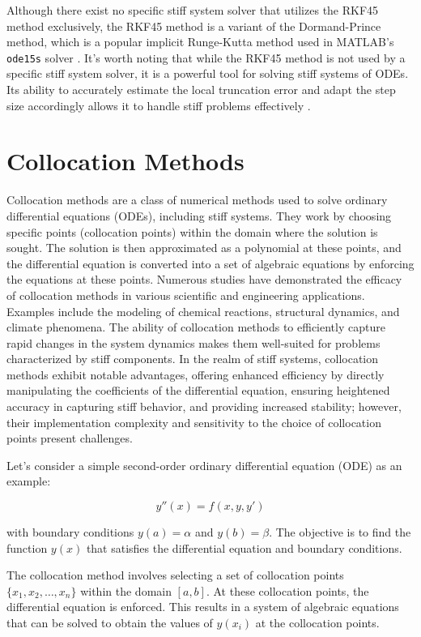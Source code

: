 Although there exist no specific stiff system solver that utilizes the RKF45 method exclusively, the RKF45 method is a variant of the Dormand-Prince method, which is a popular implicit Runge-Kutta method used in MATLAB's \texttt{ode15s} solver \cite{BurkardtRKF45}. It's worth noting that while the RKF45 method is not used by a specific stiff system solver, it is a powerful tool for solving stiff systems of ODEs. Its ability to accurately estimate the local truncation error and adapt the step size accordingly allows it to handle stiff problems effectively \cite{BurkardtRKF45}.

  

\section{Collocation Methods}
Collocation methods are a class of numerical methods used to solve ordinary differential equations (ODEs), including stiff systems. They work by choosing specific points (collocation points) within the domain where the solution is sought. The solution is then approximated as a polynomial at these points, and the differential equation is converted into a set of algebraic equations by enforcing the equations at these points.
Numerous studies have demonstrated the efficacy of collocation methods in various scientific and engineering applications. Examples include the modeling of chemical reactions, structural dynamics, and climate phenomena. The ability of collocation methods to efficiently capture rapid changes in the system dynamics makes them well-suited for problems characterized by stiff components.
In the realm of stiff systems, collocation methods exhibit notable advantages, offering enhanced efficiency by directly manipulating the coefficients of the differential equation, ensuring heightened accuracy in capturing stiff behavior, and providing increased stability; however, their implementation complexity and sensitivity to the choice of collocation points present challenges\cite{Faleichik2009ExplicitIO}.

Let's consider a simple second-order ordinary differential equation (ODE) as an example:

\[
y''(x) = f(x, y, y')
\]

with boundary conditions \(y(a) = \alpha\) and \(y(b) = \beta\). The objective is to find the function \(y(x)\) that satisfies the differential equation and boundary conditions.

The collocation method involves selecting a set of collocation points \(\{x_1, x_2, \ldots, x_n\}\) within the domain \([a, b]\). At these collocation points, the differential equation is enforced. This results in a system of algebraic equations that can be solved to obtain the values of \(y(x_i)\) at the collocation points.


